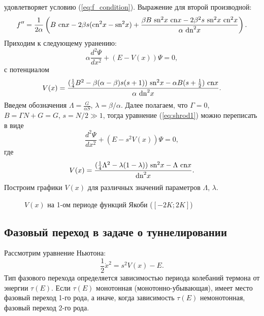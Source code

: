 \documentclass[12pt]{article}
\begin{document}
%
удовлетворяет условию (\ref{eq:f_condition}).
Выражение для второй производной:
%
$$f'' = \frac{1}{2 \alpha} \left( B~\textrm{cn} x - 2\beta s (\textrm{cn}^2 x - \textrm{sn}^2 x) + \frac{\beta B~\textrm{sn}^2 x~\textrm{cn} x - 2 \beta^2 s~\textrm{sn}^2 x~\textrm{cn}^2 x}{\alpha~\textrm{dn}^2 x} \right).$$
%
Приходим к следующему уранению:
%
\begin{equation}
\alpha \frac{d^2 \Psi}{dx^2} + (E - V(x)) \Psi = 0,
\label{eq:shrod1}
\end{equation}
%
с потенциалом
%
\begin{equation}
V(x) = \frac{(\frac{1}{4}B^2 - \beta(\alpha - \beta) s (s+1))~\textrm{sn}^2 x - \alpha B (s + \frac{1}{2})~\textrm{cn} x}{\alpha~\textrm{dn}^2 x}.
\end{equation}
%
Введем обозначения $\Lambda = \frac{G}{\alpha S}$, $\lambda = \beta / \alpha$.
Далее полагаем, что $\Gamma = 0$, $B = \Gamma N + G = G$, $s = N/2 \gg 1$, тогда уравнение (\ref{eq:shrod1}) можно переписать в виде
%
\begin{equation}
\frac{d^2 \Psi}{dx^2} + (E - s^2 V(x)) \Psi = 0,
\label{eq:shrod2}
\end{equation}
% 
где
%
\begin{equation}
V(x) = \frac{(\frac{1}{4} \Lambda^2 - \lambda (1 - \lambda))~\textrm{sn}^2 x - \Lambda~\textrm{cn} x}{\textrm{dn}^2 x}.
\end{equation}
%
Построим графики $V(x)$ для различных значений параметров $\Lambda$, $\lambda$.
%
\begin{figure}[Ht!]
\caption{$V(x)$ на 1-ом периоде функций Якоби ($[-2K; 2K]$)}
\end{figure}
%

\subsection*{Фазовый переход в задаче о туннелировании}

Рассмотрим уравнение Ньютона:
%
\begin{equation}
\frac{1}{2} \dot{x}^2 = s^2 V(x) - E.
\label{eq:newton}
\end{equation}
%
Тип фазового перехода определяется зависимостью периода колебаний термона от энергии $\tau(E)$.
Если $\tau(E)$ монотонная (монотонно-убывающая), имеет место фазовый переход 1-го рода, а иначе, когда зависимость $\tau(E)$ немонотонная, фазовый переход 2-го рода.
\end{document}
